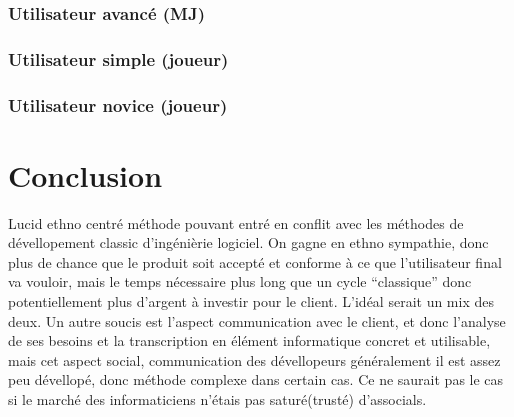 \documentclass[11pt,a4paper]{article}
\begin{document}
\subsubsection{Utilisateur avancé (MJ)}

\subsubsection{Utilisateur simple (joueur)}

\subsubsection{Utilisateur novice (joueur)}
  

\section{Conclusion}
Lucid ethno centré
méthode pouvant entré en conflit avec les méthodes de dévellopement classic
d'ingénièrie logiciel.
On gagne en ethno sympathie, donc plus de chance que le produit soit accepté et
conforme à ce que l'utilisateur final va vouloir, mais le temps nécessaire plus
long que un cycle ``classique'' donc potentiellement plus d'argent à investir
pour le client. L'idéal serait un mix des deux.
Un autre soucis est l'aspect communication avec le client, et donc l'analyse de
ses besoins et la transcription en élément informatique concret et utilisable,
mais cet aspect social, communication des dévellopeurs généralement il est assez
peu dévellopé, donc méthode complexe dans certain cas. Ce ne saurait pas le cas
si le marché des informaticiens n'étais pas saturé(trusté) d'associals. 
  
  
\end{document}
